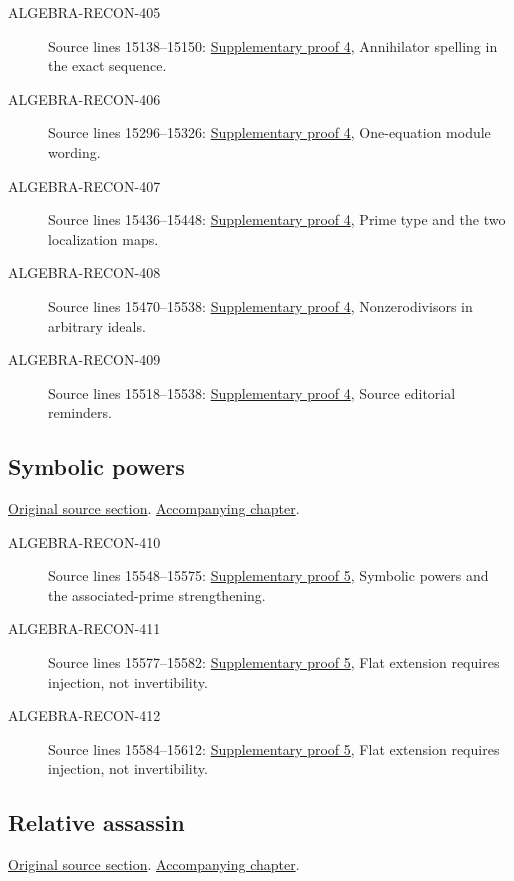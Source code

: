 \begin{description}
\item[ALGEBRA-RECON-405] Source lines 15138--15150: \hyperlink{algebra_dimension_support_associated_notes_20260927}{Supplementary proof 4}, Annihilator spelling in the exact sequence.
\item[ALGEBRA-RECON-406] Source lines 15296--15326: \hyperlink{algebra_dimension_support_associated_notes_20260927}{Supplementary proof 4}, One-equation module wording.
\item[ALGEBRA-RECON-407] Source lines 15436--15448: \hyperlink{algebra_dimension_support_associated_notes_20260927}{Supplementary proof 4}, Prime type and the two localization maps.
\item[ALGEBRA-RECON-408] Source lines 15470--15538: \hyperlink{algebra_dimension_support_associated_notes_20260927}{Supplementary proof 4}, Nonzerodivisors in arbitrary ideals.
\item[ALGEBRA-RECON-409] Source lines 15518--15538: \hyperlink{algebra_dimension_support_associated_notes_20260927}{Supplementary proof 4}, Source editorial reminders.
\end{description}

\subsection{Symbolic powers}
\hypertarget{algebra-source-section-symbolic-power}{}
\noindent\href{https://github.com/stacks/stacks-project/blob/a04446e57ec1fbc252a871afcec7752fb2807b14/algebra.tex\#L15542}{Original source section}. \href{algebra.pdf\#nameddest=section-symbolic-power}{Accompanying chapter}.

\begin{description}
\item[ALGEBRA-RECON-410] Source lines 15548--15575: \hyperlink{algebra_symbolic_weakass_notes_20260927}{Supplementary proof 5}, Symbolic powers and the associated-prime strengthening.
\item[ALGEBRA-RECON-411] Source lines 15577--15582: \hyperlink{algebra_symbolic_weakass_notes_20260927}{Supplementary proof 5}, Flat extension requires injection, not invertibility.
\item[ALGEBRA-RECON-412] Source lines 15584--15612: \hyperlink{algebra_symbolic_weakass_notes_20260927}{Supplementary proof 5}, Flat extension requires injection, not invertibility.
\end{description}

\subsection{Relative assassin}
\hypertarget{algebra-source-section-relative-assassin}{}
\noindent\href{https://github.com/stacks/stacks-project/blob/a04446e57ec1fbc252a871afcec7752fb2807b14/algebra.tex\#L15616}{Original source section}. \href{algebra.pdf\#nameddest=section-relative-assassin}{Accompanying chapter}.

